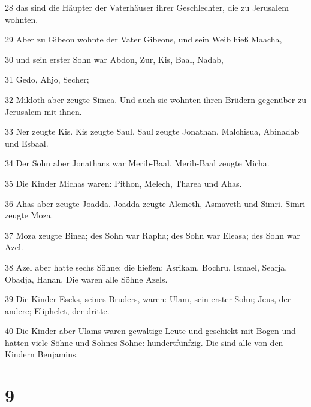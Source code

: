\par 28 das sind die Häupter der Vaterhäuser ihrer Geschlechter, die zu Jerusalem wohnten.
\par 29 Aber zu Gibeon wohnte der Vater Gibeons, und sein Weib hieß Maacha,
\par 30 und sein erster Sohn war Abdon, Zur, Kis, Baal, Nadab,
\par 31 Gedo, Ahjo, Secher;
\par 32 Mikloth aber zeugte Simea. Und auch sie wohnten ihren Brüdern gegenüber zu Jerusalem mit ihnen.
\par 33 Ner zeugte Kis. Kis zeugte Saul. Saul zeugte Jonathan, Malchisua, Abinadab und Esbaal.
\par 34 Der Sohn aber Jonathans war Merib-Baal. Merib-Baal zeugte Micha.
\par 35 Die Kinder Michas waren: Pithon, Melech, Tharea und Ahas.
\par 36 Ahas aber zeugte Joadda. Joadda zeugte Alemeth, Asmaveth und Simri. Simri zeugte Moza.
\par 37 Moza zeugte Binea; des Sohn war Rapha; des Sohn war Eleasa; des Sohn war Azel.
\par 38 Azel aber hatte sechs Söhne; die hießen: Asrikam, Bochru, Ismael, Searja, Obadja, Hanan. Die waren alle Söhne Azels.
\par 39 Die Kinder Eseks, seines Bruders, waren: Ulam, sein erster Sohn; Jeus, der andere; Eliphelet, der dritte.
\par 40 Die Kinder aber Ulams waren gewaltige Leute und geschickt mit Bogen und hatten viele Söhne und Sohnes-Söhne: hundertfünfzig. Die sind alle von den Kindern Benjamins.

\chapter{9}

